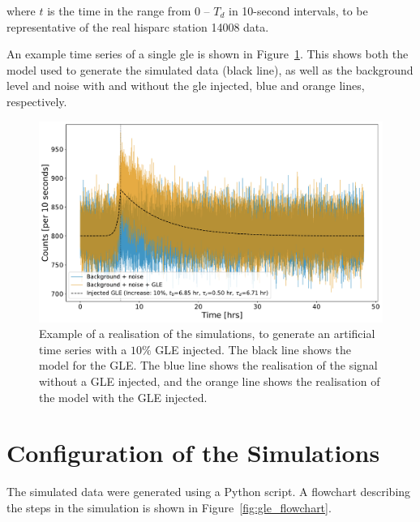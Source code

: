 where $t$ is the time in the range from 0 -- $T_d$ in 10-second intervals, to be representative of the real \gls{hisparc} station 14008 data.

An example time series of a single \gls{gle} is shown in Figure~\ref{fig:simulated_HS14008_GLE_data}. This shows both the model used to generate the simulated data (black line), as well as the background level and noise with and without the \gls{gle} injected, blue and orange lines, respectively.

\begin{figure}[ht!]
	\centering
	\includegraphics[width=\columnwidth]{simulated_HS14008_GLE_data.pdf}
	\caption{Example of a realisation of the simulations, to generate an artificial time series with a $10 \%$ GLE injected. The black line shows the model for the GLE. The blue line shows the realisation of the signal without a GLE injected, and the orange line shows the realisation of the model with the GLE injected.}
	\label{fig:simulated_HS14008_GLE_data}
\end{figure}


\section{Configuration of the Simulations}

The simulated data were generated using a Python script. A flowchart describing the steps in the simulation is shown in Figure~\ref{fig:gle_flowchart}. 


